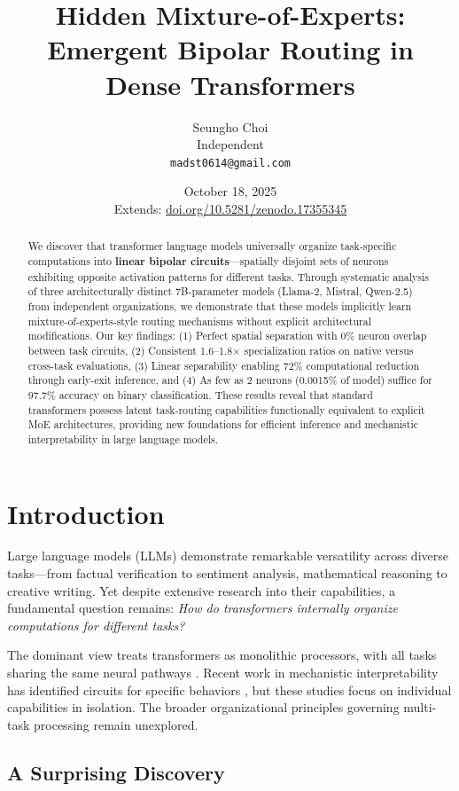 \documentclass{article}
\title{\textbf{Hidden Mixture-of-Experts: \\ Emergent Bipolar Routing in Dense Transformers}}
\author{
Seungho Choi \\
Independent \\
\texttt{madst0614@gmail.com}
}
\date{October 18, 2025 \\ \small Extends: \href{https://doi.org/10.5281/zenodo.17355345}{doi.org/10.5281/zenodo.17355345}}
\begin{document}
\maketitle

\begin{abstract}
We discover that transformer language models universally organize task-specific computations into \textbf{linear bipolar circuits}—spatially disjoint sets of neurons exhibiting opposite activation patterns for different tasks. Through systematic analysis of three architecturally distinct 7B-parameter models (Llama-2, Mistral, Qwen-2.5) from independent organizations, we demonstrate that these models implicitly learn mixture-of-experts-style routing mechanisms without explicit architectural modifications. Our key findings: (1) Perfect spatial separation with 0\% neuron overlap between task circuits, (2) Consistent 1.6--1.8$\times$ specialization ratios on native versus cross-task evaluations, (3) Linear separability enabling 72\% computational reduction through early-exit inference, and (4) As few as 2 neurons (0.0015\% of model) suffice for 97.7\% accuracy on binary classification. These results reveal that standard transformers possess latent task-routing capabilities functionally equivalent to explicit MoE architectures, providing new foundations for efficient inference and mechanistic interpretability in large language models.
\end{abstract}

\section{Introduction}

Large language models (LLMs) demonstrate remarkable versatility across diverse tasks—from factual verification to sentiment analysis, mathematical reasoning to creative writing. Yet despite extensive research into their capabilities, a fundamental question remains: \textit{How do transformers internally organize computations for different tasks?}

The dominant view treats transformers as monolithic processors, with all tasks sharing the same neural pathways \cite{vaswani2017attention}. Recent work in mechanistic interpretability has identified circuits for specific behaviors \cite{olah2020zoom,elhage2021mathematical}, but these studies focus on individual capabilities in isolation. The broader organizational principles governing multi-task processing remain unexplored.

\subsection{A Surprising Discovery}
\end{document}

